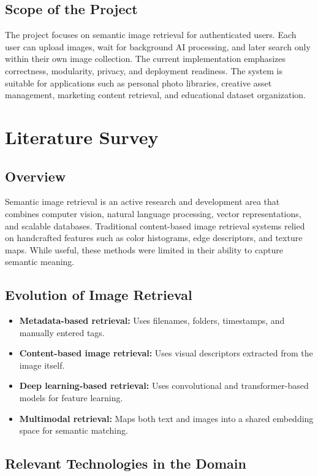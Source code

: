 \documentclass[12pt,a4paper]{report}
\begin{document}
\section{Scope of the Project}
The project focuses on semantic image retrieval for authenticated users. Each user can upload images, wait for background AI processing, and later search only within their own image collection. The current implementation emphasizes correctness, modularity, privacy, and deployment readiness. The system is suitable for applications such as personal photo libraries, creative asset management, marketing content retrieval, and educational dataset organization.

\chapter{Literature Survey}
\section{Overview}
Semantic image retrieval is an active research and development area that combines computer vision, natural language processing, vector representations, and scalable databases. Traditional content-based image retrieval systems relied on handcrafted features such as color histograms, edge descriptors, and texture maps. While useful, these methods were limited in their ability to capture semantic meaning.

\section{Evolution of Image Retrieval}
\begin{itemize}[leftmargin=*]
    \item \textbf{Metadata-based retrieval:} Uses filenames, folders, timestamps, and manually entered tags.
    \item \textbf{Content-based image retrieval:} Uses visual descriptors extracted from the image itself.
    \item \textbf{Deep learning-based retrieval:} Uses convolutional and transformer-based models for feature learning.
    \item \textbf{Multimodal retrieval:} Maps both text and images into a shared embedding space for semantic matching.
\end{itemize}

\section{Relevant Technologies in the Domain}
\end{document}
